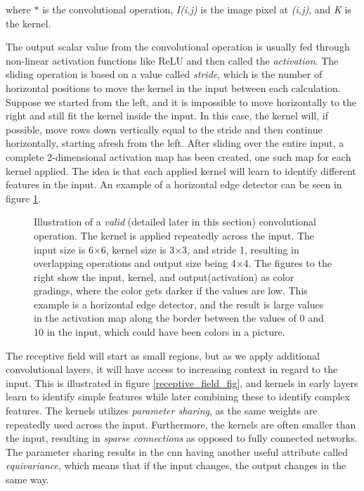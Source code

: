      where $*$ is the convolutional operation, \textit{I(i,j)} is the image pixel at \textit{(i,j)}, and \textit{K} is the kernel.
     
    The output scalar value from the convolutional operation is usually fed through non-linear activation functions like ReLU and then called the \textit{activation}. The sliding operation is based on a value called \textit{stride}, which is the number of horizontal positions to move the kernel in the input between each calculation. Suppose we started from the left, and it is impossible to move horizontally to the right and still fit the kernel inside the input. In this case, the kernel will, if possible, move rows down vertically equal to the stride and then continue horizontally, starting afresh from the left. After sliding over the entire input, a complete 2-dimensional activation map has been created, one such map for each kernel applied. The idea is that each applied kernel will learn to identify different features in the input. An example of a horizontal edge detector can be seen in figure \ref{convolutional_fig}\cite{o2015introduction_convolutions}. 
    \begin{figure}[H]
        \centering
                
        \caption[Horizontal edge detector example]{Illustration of a \textit{valid} (detailed later in this section) convolutional operation. The kernel is applied repeatedly across the input. The input size is 6×6, kernel size is 3×3, and stride 1, resulting in overlapping operations and output size being 4×4. The figures to the right show the input, kernel, and output(activation) as color gradings, where the color gets darker if the values are low. This example is a horizontal edge detector, and the result is large values in the activation map along the border between the values of 0 and 10 in the input, which could have been colors in a picture.}
      	\medskip 
        \label{convolutional_fig}
    \end{figure}
    
    The receptive field will start as small regions, but as we apply additional convolutional layers, it will have access to increasing context in regard to the input\cite{Goodfellow-et-al-2016}. This is illustrated in figure \ref{receptive_field_fig}, and kernels in early layers learn to identify simple features while later combining these to identify complex features. The kernels utilizes \textit{parameter sharing}, as the same weights are repeatedly used across the input. Furthermore, the kernels are often smaller than the input, resulting in \textit{sparse connections} as opposed to fully connected networks. The parameter sharing results in the \gls{cnn} having another useful attribute called \textit{equivariance}, which means that if the input changes, the output changes in the same way.
    
